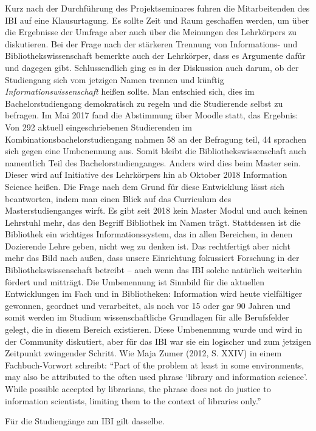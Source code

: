 \documentclass[a4paper,
fontsize=11pt,
oneside,
numbers=noperiodatend,
parskip=half-,
bibliography=totoc,
final
]{scrartcl}
\begin{document}
Kurz nach der Durchführung des Projektseminares fuhren die
Mitarbeitenden des IBI auf eine Klausurtagung. Es sollte Zeit und Raum
geschaffen werden, um über die Ergebnisse der Umfrage aber auch über die
Meinungen des Lehrkörpers zu diskutieren. Bei der Frage nach der
stärkeren Trennung von Informations- und Bibliothekswissenschaft
bemerkte auch der Lehrkörper, dass es Argumente dafür und dagegen gibt.
Schlussendlich ging es in der Diskussion auch darum, ob der Studiengang
sich vom jetzigen Namen trennen und künftig
\emph{Informationswissenschaft} heißen sollte. Man entschied sich, dies
im Bachelorstudiengang demokratisch zu regeln und die Studierende selbst
zu befragen. Im Mai 2017 fand die Abstimmung über Moodle statt, das
Ergebnis: Von 292 aktuell eingeschriebenen Studierenden im
Kombinationsbachelorstudiengang nahmen 58 an der Befragung teil, 44
sprachen sich gegen eine Umbenennung aus. Somit bleibt die
Bibliothekswissenschaft auch namentlich Teil des Bachelorstudienganges.
Anders wird dies beim Master sein. Dieser wird auf Initiative des
Lehrkörpers hin ab Oktober 2018 Information Science heißen. Die Frage
nach dem Grund für diese Entwicklung lässt sich beantworten, indem man
einen Blick auf das Curriculum des Masterstudienganges wirft. Es gibt
seit 2018 kein Master Modul und auch keinen Lehrstuhl mehr, das den
Begriff Bibliothek im Namen trägt. Stattdessen ist die Bibliothek ein
wichtiges Informationssystem, das in allen Bereichen, in denen
Dozierende Lehre geben, nicht weg zu denken ist. Das rechtfertigt aber
nicht mehr das Bild nach außen, dass unsere Einrichtung fokussiert
Forschung in der Bibliothekswissenschaft betreibt -- auch wenn das IBI
solche natürlich weiterhin fördert und mitträgt. Die Umbenennung ist
Sinnbild für die aktuellen Entwicklungen im Fach und in Bibliotheken:
Information wird heute vielfältiger gewonnen, geordnet und verarbeitet,
als noch vor 15 oder gar 90 Jahren und somit werden im Studium
wissenschaftliche Grundlagen für alle Berufsfelder gelegt, die in diesem
Bereich existieren. Diese Umbenennung wurde und wird in der Community
diskutiert, aber für das IBI war sie ein logischer und zum jetzigen
Zeitpunkt zwingender Schritt. Wie Maja Zumer (2012, S. XXIV) in einem
Fachbuch-Vorwort schreibt: \enquote{Part of the problem at least in some
environments, may also be attributed to the often used phrase
\enquote{library and information science}. While possible accepted by
librarians, the phrase does not do justice to information scientists,
limiting them to the context of libraries only.}

Für die Studiengänge am IBI gilt dasselbe.
\end{document}
